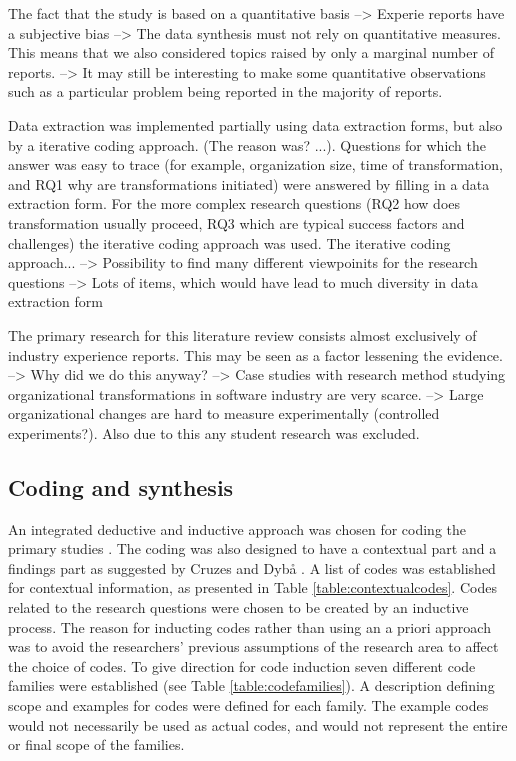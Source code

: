 \documentclass[preprint,authoryear,12pt]{elsarticle}
\begin{document}
The fact that the study is based on a quantitative basis
--> Experie reports have a subjective bias
--> The data synthesis must not rely on quantitative measures. This means that
    we also considered topics raised by only a marginal number of reports.
--> It may still be interesting to make some quantitative observations such as
    a particular problem being reported in the majority of reports.


Data extraction was implemented partially using data extraction forms, but also
by a iterative coding approach. (The reason was? ...). Questions for which the
answer was easy to trace (for example, organization size, time of
transformation, and RQ1 why are transformations initiated) were answered by
filling in a data extraction form. For the more complex research questions (RQ2
how does transformation usually proceed, RQ3 which are typical success factors
and challenges) the iterative coding approach was used. The iterative coding
approach...
--> Possibility to find many different viewpoinits for the research questions
--> Lots of items, which would have lead to much diversity in data extraction form 


The primary research for this literature review consists almost exclusively of
industry experience reports. This may be seen as a factor lessening the
evidence.
--> Why did we do this anyway?
--> Case studies with research method studying organizational transformations in
    software industry are very scarce.
--> Large organizational changes are hard to measure experimentally (controlled
    experiments?). Also due to this any student research was excluded.


\subsection{Coding and synthesis}

An integrated deductive and inductive approach was chosen for coding the primary
studies \cite{Cruzes2011a}. The coding was also designed to have a contextual
part and a findings part as suggested by Cruzes and Dybå \cite{Cruzes2011a}. A
list of codes was established for contextual information, as presented in Table
\ref{table:contextualcodes}. Codes related to the research questions were chosen
to be created by an inductive process. The reason for inducting codes rather
than using an a priori approach was to avoid the researchers' previous
assumptions of the research area to affect the choice of codes. To give
direction for code induction seven different code families were established (see
Table \ref{table:codefamilies}). A description defining scope and examples for
codes were defined for each family. The example codes would not necessarily be
used as actual codes, and would not represent the entire or final scope of the
families.
\end{document}
